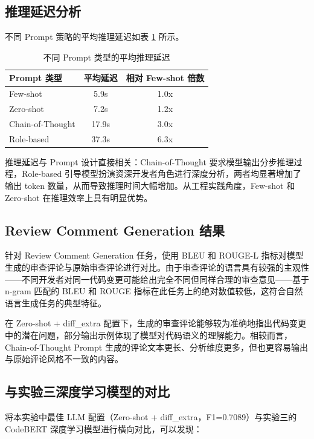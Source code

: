 \documentclass{experimentreport}
\begin{document}
{\subsection{推理延迟分析}

不同 Prompt 策略的平均推理延迟如表 \ref{tab:latency} 所示。

\begin{table}[htbp]
  \centering
  \caption{不同 Prompt 类型的平均推理延迟}
  \label{tab:latency}
  \begin{tabular}{lcc}
    \hline
    Prompt 类型 & 平均延迟 & 相对 Few-shot 倍数 \\
    \hline
    Few-shot & 5.9s & 1.0x \\
    Zero-shot & 7.2s & 1.2x \\
    Chain-of-Thought & 17.9s & 3.0x \\
    Role-based & 37.3s & 6.3x \\
    \hline
  \end{tabular}
\end{table}

推理延迟与 Prompt 设计直接相关：Chain-of-Thought 要求模型输出分步推理过程，Role-based 引导模型扮演资深开发者角色进行深度分析，两者均显著增加了输出 token 数量，从而导致推理时间大幅增加。从工程实践角度，Few-shot 和 Zero-shot 在推理效率上具有明显优势。

\subsection{Review Comment Generation 结果}

针对 Review Comment Generation 任务，使用 BLEU 和 ROUGE-L 指标对模型生成的审查评论与原始审查评论进行对比。由于审查评论的语言具有较强的主观性——不同开发者对同一代码变更可能给出完全不同但同样合理的审查意见——基于 n-gram 匹配的 BLEU 和 ROUGE 指标在此任务上的绝对数值较低，这符合自然语言生成任务的典型特征。

在 Zero-shot + diff\_extra 配置下，生成的审查评论能够较为准确地指出代码变更中的潜在问题，部分输出示例体现了模型对代码语义的理解能力。相较而言，Chain-of-Thought Prompt 生成的评论文本更长、分析维度更多，但也更容易输出与原始评论风格不一致的内容。

\subsection{与实验三深度学习模型的对比}

将本实验中最佳 LLM 配置（Zero-shot + diff\_extra，F1=0.7089）与实验三的 CodeBERT 深度学习模型进行横向对比，可以发现：

}
\end{document}
